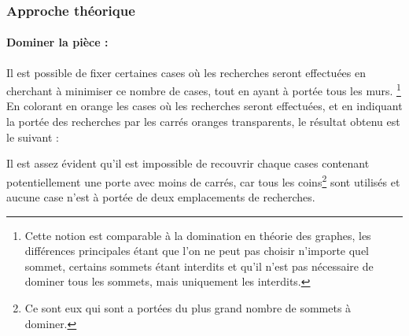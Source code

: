 \documentclass[a4paper,12pt]{article}
\begin{document}
\subsubsection{Approche théorique}

\paragraph{Dominer la pièce :}
Il est possible de fixer certaines cases où les recherches seront effectuées en
cherchant à minimiser ce nombre de cases, tout en ayant à portée tous les murs.
\footnote{Cette notion est comparable à la domination en théorie des graphes,
  les différences principales étant que l'on ne peut pas choisir n'importe quel
  sommet, certains sommets étant interdits et qu'il n'est pas nécessaire de
  dominer tous les sommets, mais uniquement les interdits.}
\\
En colorant en orange les cases où les recherches seront effectuées, et en
indiquant la portée des recherches par les carrés oranges transparents, le
résultat obtenu est le suivant :

\begin{center}
\end{center}
Il est assez évident qu'il est impossible de recouvrir chaque cases contenant
potentiellement une porte avec moins de carrés, car tous les coins\footnote{Ce
sont eux qui sont a portées du plus grand nombre de sommets à dominer.} sont
utilisés et aucune case n'est à portée de deux emplacements de recherches.
\end{document}
